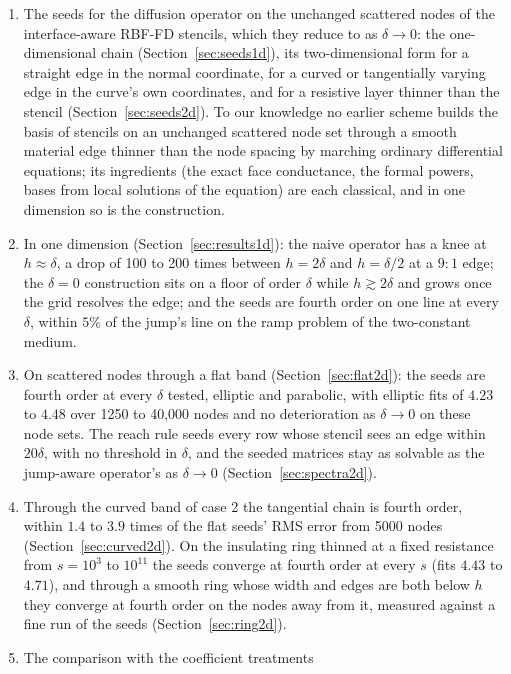\documentclass[11pt]{amsart}
\theoremstyle{definition}
\theoremstyle{remark}
\begin{document}
\begin{enumerate}
\item The seeds for the diffusion operator on the unchanged scattered nodes
  of the interface-aware RBF-FD stencils, which they reduce to as
  $\delta \to 0$: the one-dimensional chain (Section~\ref{sec:seeds1d}), its
  two-dimensional form for a straight edge in the normal coordinate, for a
  curved or tangentially varying edge in the curve's own coordinates, and
  for a resistive layer thinner than the stencil
  (Section~\ref{sec:seeds2d}). To our knowledge no earlier scheme builds
  the basis of stencils on an unchanged scattered node set through a smooth
  material edge thinner than the node spacing by marching ordinary
  differential equations; its ingredients (the exact face conductance, the
  formal powers, bases from local solutions of the equation) are each
  classical, and in one dimension so is the construction.
\item In one dimension (Section~\ref{sec:results1d}): the naive operator
  has a knee at $h \approx \delta$, a drop of 100 to 200 times between
  $h = 2\delta$ and $h = \delta/2$ at a $9 : 1$ edge; the $\delta = 0$
  construction sits on a floor of order $\delta$ while $h \gtrsim 2\delta$
  and grows once the grid resolves the edge; and the seeds are fourth order
  on one line at every $\delta$, within $5\%$ of the jump's line on the ramp
  problem of the two-constant medium.
\item On scattered nodes through a flat band (Section~\ref{sec:flat2d}):
  the seeds are fourth order at every $\delta$ tested, elliptic and
  parabolic, with elliptic fits of $4.23$ to $4.48$ over 1250 to 40,000
  nodes and no deterioration as $\delta \to 0$ on these node sets. The
  reach rule seeds every row whose stencil sees an edge within $20\delta$,
  with no threshold in $\delta$, and the seeded matrices stay as solvable
  as the jump-aware operator's as $\delta \to 0$
  (Section~\ref{sec:spectra2d}).
\item Through the curved band of case 2 the tangential chain is fourth
  order, within $1.4$ to $3.9$ times of the flat seeds' RMS error from 5000
  nodes (Section~\ref{sec:curved2d}). On the insulating ring thinned at a
  fixed resistance from $s = 10^3$ to $10^{11}$ the seeds converge at
  fourth order at every $s$ (fits $4.43$ to $4.71$), and through a smooth
  ring whose width and edges are both below $h$ they converge at fourth
  order on the nodes away from it, measured against a fine run of the
  seeds (Section~\ref{sec:ring2d}).
\item The comparison with the coefficient treatments

\end{enumerate}
\end{document}

